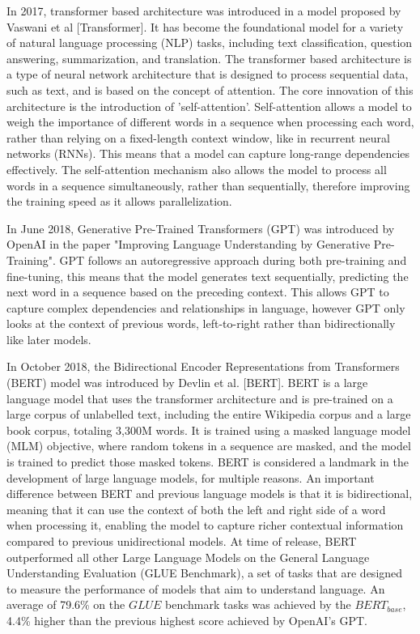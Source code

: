 \documentclass{UoYCSproject}
\begin{document}
In 2017, transformer based architecture was introduced in a model proposed by Vaswani et al [Transformer].
It has become the foundational model for a variety of natural language processing (NLP) tasks, including text classification, question answering, summarization, and translation.
The transformer based architecture is a type of neural network architecture that is designed to process sequential data, such as text, and is based on the concept of attention.
The core innovation of this architecture is the introduction of 'self-attention'.
Self-attention allows a model to weigh the importance of different words in a sequence when processing each word, rather than relying on a fixed-length context window, like in recurrent neural networks (RNNs).
This means that a model can capture long-range dependencies effectively.
The self-attention mechanism also allows the model to process all words in a sequence simultaneously, rather than sequentially, therefore improving the training speed as it allows parallelization.
\par
In June 2018, Generative Pre-Trained Transformers (GPT) was introduced by OpenAI in the paper "Improving Language Understanding by Generative Pre-Training".
GPT follows an autoregressive approach during both pre-training and fine-tuning, this means that the model generates text sequentially, predicting the next word in a sequence based on the preceding context.
This allows GPT to capture complex dependencies and relationships in language, however GPT only looks at the context of previous words, left-to-right rather than bidirectionally like later models.

In October 2018, the Bidirectional Encoder Representations from Transformers (BERT) model was introduced by Devlin et al.
[BERT].
BERT is a large language model that uses the transformer architecture and is pre-trained on a large corpus of unlabelled text, including the entire Wikipedia corpus and a large book corpus, totaling 3,300M words.
It is trained using a masked language model (MLM) objective, where random tokens in a sequence are masked, and the model is trained to predict those masked tokens.
BERT is considered a landmark in the development of large language models, for multiple reasons.
An important difference between BERT and previous language models is that it is bidirectional, meaning that it can
use the context of both the left and right side of a word when processing it, enabling the model to capture richer contextual information compared to previous unidirectional models.
At time of release, BERT outperformed all other Large Language Models on the General Language Understanding Evaluation (GLUE Benchmark), a set of tasks that are designed to measure the performance of models that aim to understand language.
An average of 79.6\% on the $GLUE$ benchmark tasks was achieved by the $BERT_{base}$, 4.4\% higher than the previous highest score achieved by OpenAI's GPT.
\end{document}
